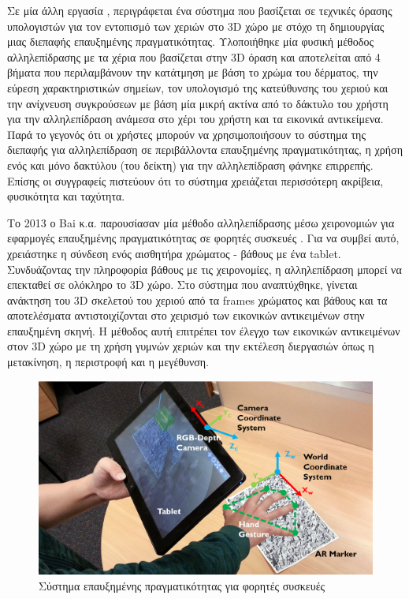 Σε μία άλλη εργασία \cite{Lee2008}, περιγράφεται ένα σύστημα που βασίζεται σε τεχνικές όρασης υπολογιστών για τον εντοπισμό των χεριών στο 3D χώρο με στόχο τη δημιουργίας μιας διεπαφής επαυξημένης πραγματικότητας.  Υλοποιήθηκε μία φυσική μέθοδος αλληλεπίδρασης με τα χέρια που βασίζεται στην 3D όραση και αποτελείται από 4 βήματα που περιλαμβάνουν την κατάτμηση με βάση το χρώμα του δέρματος, την εύρεση χαρακτηριστικών σημείων, τον υπολογισμό της κατεύθυνσης του χεριού και την ανίχνευση συγκρούσεων με βάση μία μικρή ακτίνα από το δάκτυλο του χρήστη για την αλληλεπίδραση ανάμεσα στο χέρι του χρήστη και τα εικονικά αντικείμενα. Παρά το γεγονός ότι οι χρήστες μπορούν να χρησιμοποιήσουν το σύστημα της διεπαφής για αλληλεπίδραση σε περιβάλλοντα επαυξημένης πραγματικότητας, η χρήση ενός και μόνο δακτύλου (του δείκτη) για την αλληλεπίδραση φάνηκε επιρρεπής. Επίσης οι συγγραφείς πιστεύουν ότι το σύστημα χρειάζεται περισσότερη ακρίβεια, φυσικότητα και ταχύτητα.



Το 2013 ο Bai κ.α. παρουσίασαν μία μέθοδο αλληλεπίδρασης μέσω χειρονομιών για εφαρμογές επαυξημένης πραγματικότητας σε φορητές συσκευές \cite{Bai2013}. Για να συμβεί αυτό, χρειάστηκε η σύνδεση ενός αισθητήρα χρώματος - βάθους με ένα tablet.
Συνδυάζοντας την πληροφορία βάθους με τις χειρονομίες, η αλληλεπίδραση μπορεί να επεκταθεί σε ολόκληρο το 3D χώρο. Στο σύστημα που αναπτύχθηκε, γίνεται ανάκτηση του 3D σκελετού του χεριού από τα frames χρώματος και βάθους και τα αποτελέσματα αντιστοιχίζονται στο χειρισμό των εικονικών αντικειμένων στην επαυξημένη σκηνή. Η μέθοδος αυτή επιτρέπει τον έλεγχο των εικονικών αντικειμένων στον 3D χώρο με τη χρήση γυμνών χεριών και την εκτέλεση διεργασιών όπως η μετακίνηση, η περιστροφή και η μεγέθυνση. 

\begin{figure}[H]
    \centering
    \includegraphics[scale=0.44, angle=0]{Files/Figures/BaiApp.png}
    \caption[Σύστημα επαυξημένης πραγματικότητας για φορητές συσκευές]{Σύστημα επαυξημένης πραγματικότητας για φορητές συσκευές \cite{Bai2013}}
    \label{fig:handheld_ex}
\end{figure}



